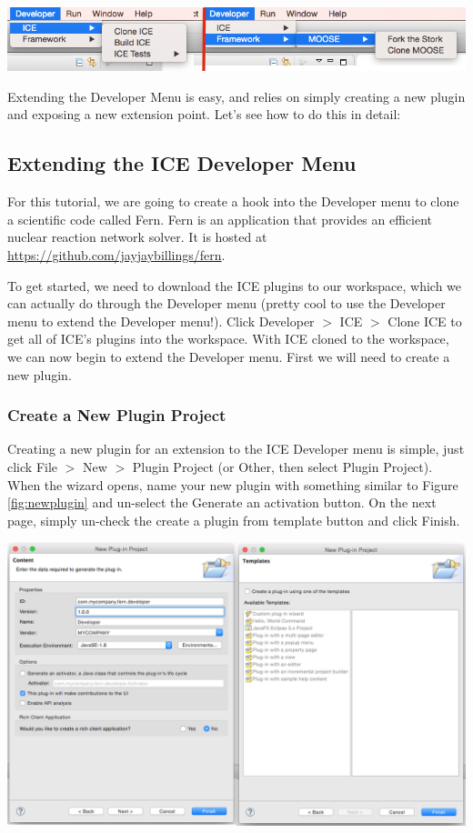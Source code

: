 \documentclass{article}
\begin{document}
\begin{center}
\includegraphics[width=\textwidth]{figures/menu.png}
\label{fig:devcloneice}
\end{center}

Extending the Developer Menu is easy, and relies on simply creating a new plugin
and exposing a new extension point. Let's see how to do this in detail:

\subsection{Extending the ICE Developer Menu}
For this tutorial, we are going to create a hook into the Developer menu to
clone a scientific code called Fern. Fern is an application that provides an
efficient nuclear reaction network solver. It is hosted at
\url{https://github.com/jayjaybillings/fern}. 

To get started, we need to download the ICE plugins to our workspace, which we
can actually do through the Developer menu (pretty cool to use the Developer 
menu to extend the Developer menu!). Click Developer $>$ ICE $>$ Clone ICE to 
get all of ICE's plugins into the workspace. With ICE cloned to the workspace, 
we can now begin to extend the Developer menu. First we will need to create a new
plugin. 

\subsubsection{Create a New Plugin Project}
Creating a new plugin for an extension to the ICE Developer menu is simple, just
click File $>$ New $>$ Plugin Project (or Other, then select Plugin Project).
When the wizard opens, name your new plugin with something similar to Figure
\ref{fig:newplugin} and un-select the Generate an activation button. On the next
page, simply un-check the create a plugin from template button and click Finish. 
\begin{center}
\includegraphics[width=\textwidth]{figures/combinedplugin.png}
\label{fig:newplugin}
\end{center}
\end{document}

